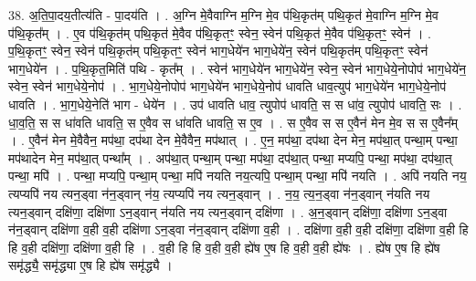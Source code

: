 \documentclass[17pt]{extarticle}
\begin{document}
38. अ॒ति॒पा॒दय॒तीत्य॑ति - पा॒दय॑ति । . अ॒ग्नि मे॒वैवाग्नि म॒ग्नि मे॒व प॑थि॒कृत॑म् पथि॒कृत॑ मे॒वाग्नि म॒ग्नि मे॒व प॑थि॒कृत᳚म् । . ए॒व प॑थि॒कृत॑म् पथि॒कृत॑ मे॒वैव प॑थि॒कृतꣳ॒॒ स्वेन॒ स्वेन॑ पथि॒कृत॑ मे॒वैव प॑थि॒कृतꣳ॒॒ स्वेन॑ । . प॒थि॒कृतꣳ॒॒ स्वेन॒ स्वेन॑ पथि॒कृत॑म् पथि॒कृतꣳ॒॒ स्वेन॑ भाग॒धेये॑न भाग॒धेये॑न॒ स्वेन॑ पथि॒कृत॑म् पथि॒कृतꣳ॒॒ स्वेन॑ भाग॒धेये॑न । . प॒थि॒कृत॒मिति॑ पथि - कृत᳚म् । . स्वेन॑ भाग॒धेये॑न भाग॒धेये॑न॒ स्वेन॒ स्वेन॑ भाग॒धेये॒नोपोप॑ भाग॒धेये॑न॒ स्वेन॒ स्वेन॑ भाग॒धेये॒नोप॑ । . भा॒ग॒धेये॒नोपोप॑ भाग॒धेये॑न भाग॒धेये॒नोप॑ धावति धाव॒त्युप॑ भाग॒धेये॑न भाग॒धेये॒नोप॑ धावति । . भा॒ग॒धेये॒नेति॑ भाग - धेये॑न । . उप॑ धावति धाव॒ त्युपोप॑ धावति॒ स स धा॑व॒ त्युपोप॑ धावति॒ सः । . धा॒व॒ति॒ स स धा॑वति धावति॒ स ए॒वैव स धा॑वति धावति॒ स ए॒व । . स ए॒वैव स स ए॒वैन॑ मेन मे॒व स स ए॒वैन᳚म् । . ए॒वैन॑ मेन मे॒वैवैन॒ मप॑था॒ दप॑था देन मे॒वैवैन॒ मप॑थात् । . ए॒न॒ मप॑था॒ दप॑था देन मेन॒ मप॑था॒त् पन्था॒म् पन्था॒ मप॑थादेन मेन॒ मप॑था॒त् पन्था᳚म् । . अप॑था॒त् पन्था॒म् पन्था॒ मप॑था॒ दप॑था॒त् पन्था॒ मप्यपि॒ पन्था॒ मप॑था॒ दप॑था॒त् पन्था॒ मपि॑ । . पन्था॒ मप्यपि॒ पन्था॒म् पन्था॒ मपि॑ नयति नय॒त्यपि॒ पन्था॒म् पन्था॒ मपि॑ नयति । . अपि॑ नयति नय॒ त्यप्यपि॑ नय त्यन॒ड्वा न॑न॒ड्वान् न॑य॒ त्यप्यपि॑ नय त्यन॒ड्वान् । . न॒य॒ त्य॒न॒ड्वा न॑न॒ड्वान् न॑यति नय त्यन॒ड्वान् दक्षि॑णा॒ दक्षि॑णा ऽन॒ड्वान् न॑यति नय त्यन॒ड्वान् दक्षि॑णा । . अ॒न॒ड्वान् दक्षि॑णा॒ दक्षि॑णा ऽन॒ड्वा न॑न॒ड्वान् दक्षि॑णा व॒ही व॒ही दक्षि॑णा ऽन॒ड्वा न॑न॒ड्वान् दक्षि॑णा व॒ही । . दक्षि॑णा व॒ही व॒ही दक्षि॑णा॒ दक्षि॑णा व॒ही हि हि व॒ही दक्षि॑णा॒ दक्षि॑णा व॒ही हि । . व॒ही हि हि व॒ही व॒ही ह्ये॑ष ए॒ष हि व॒ही व॒ही ह्ये॑षः । . ह्ये॑ष ए॒ष हि ह्ये॑ष समृ॑द्ध्यै॒ समृ॑द्ध्या ए॒ष हि ह्ये॑ष समृ॑द्ध्यै । \newline
\end{document}

